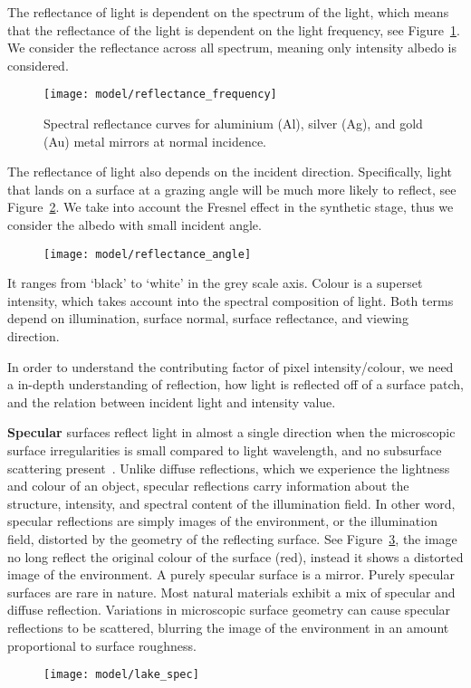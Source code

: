 The reflectance of light is dependent on the spectrum of the light, which means that the reflectance of the light is dependent on the light frequency, see Figure~\ref{fig:alb_freq}. We consider the reflectance across all spectrum, meaning only intensity albedo is considered.
\begin{figure}[h]
\centering
\texttt{[image: model/reflectance\_frequency]}
\label{fig:alb_freq}
\caption{Spectral reflectance curves for aluminium (Al), silver (Ag), and gold (Au) metal mirrors at normal incidence.}
\end{figure}

The reflectance of light also depends on the incident direction. Specifically, light that lands on a surface at a grazing angle will be much more likely to reflect, see Figure~\ref{fig:alb_ang}. We take into account the Fresnel effect in the synthetic stage, thus we consider the albedo with small incident angle.
\begin{figure}[h]
\centering
\texttt{[image: model/reflectance\_angle]}
\label{fig:alb_ang}
\end{figure}

It ranges from `black' to `white' in the grey scale axis. Colour is a superset intensity, which takes account into the spectral composition of light. Both terms depend on illumination, surface normal, surface reflectance, and viewing direction.

In order to understand the contributing factor of pixel intensity/colour, we need a in-depth understanding of reflection, \ie how light is reflected off of a surface patch, and the relation between incident light and intensity value.

\textbf{Specular} surfaces reflect light in almost a single direction when the microscopic surface irregularities is small compared to light wavelength, and no subsurface scattering present~\cite{nayar1989surface}. Unlike diffuse reflections, which we experience the lightness and colour of an object, specular reflections carry information about the structure, intensity, and spectral content of the illumination field. In other word, specular reflections are simply images of the environment, or the illumination field, distorted by the geometry of the reflecting surface. See Figure~\ref{fig:lake_spec}, the image no long reflect the original colour of the surface (red), instead it shows a distorted image of the environment. A purely specular surface is a mirror. Purely specular surfaces are rare in nature. Most natural materials exhibit a mix of specular and diffuse reflection. Variations in microscopic surface geometry can cause specular reflections to be scattered, blurring the image of the environment in an amount proportional to surface roughness.
\begin{figure}[h]
\centering
\texttt{[image: model/lake\_spec]}
\label{fig:lake_spec}
\end{figure}

